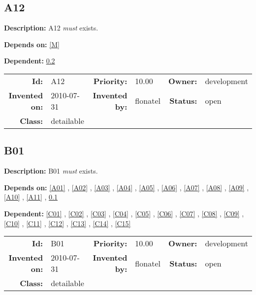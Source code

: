 \subsection{A12}\label{A12}
\textbf{Description:} A12 \textsl{must} exists.

\textbf{Depends on:} \ref{M} 

\textbf{Dependent:} \ref{B01} 

\par
{\small \begin{center}\begin{tabular}{rlrlrl}
\textbf{Id:} & A12  & \textbf{Priority:} & 10.00  & \textbf{Owner:} & development\\ 
\textbf{Invented on:} & 2010-07-31  & \textbf{Invented by:} & flonatel  & \textbf{Status:} & open \\ 
\textbf{Class:} & detailable  & & & \end{tabular}\end{center} }
\subsection{B01}\label{B01}
\textbf{Description:} B01 \textsl{must} exists.

\textbf{Depends on:} \ref{A01} , \ref{A02} , \ref{A03} , \ref{A04} , \ref{A05} , \ref{A06} , \ref{A07} , \ref{A08} , \ref{A09} , \ref{A10} , \ref{A11} , \ref{A12} 

\textbf{Dependent:} \ref{C01} , \ref{C02} , \ref{C03} , \ref{C04} , \ref{C05} , \ref{C06} , \ref{C07} , \ref{C08} , \ref{C09} , \ref{C10} , \ref{C11} , \ref{C12} , \ref{C13} , \ref{C14} , \ref{C15} 

\par
{\small \begin{center}\begin{tabular}{rlrlrl}
\textbf{Id:} & B01  & \textbf{Priority:} & 10.00  & \textbf{Owner:} & development\\ 
\textbf{Invented on:} & 2010-07-31  & \textbf{Invented by:} & flonatel  & \textbf{Status:} & open \\ 
\textbf{Class:} & detailable  & & & \end{tabular}\end{center} }
